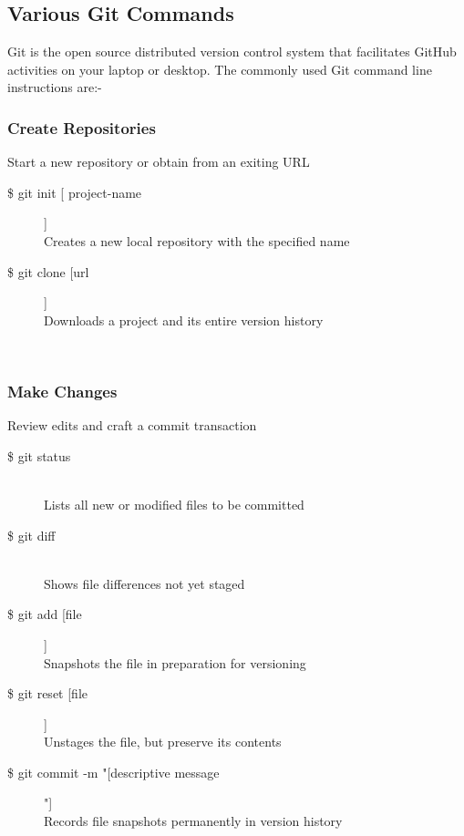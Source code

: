 \subsection{Various Git Commands}

Git is the open source distributed version control system that facilitates GitHub activities on your laptop or desktop. The commonly used Git command line instructions are:-\\



\subsubsection{Create Repositories}
Start a new repository or obtain from an exiting URL

\begin{description}

\item [\$ git init [ project-name]]\\
Creates a new local repository with the specified name
\item [\$ git clone [url]]\\
Downloads a project and its entire version history

\end{description}
\leavevmode \\


\subsubsection{Make Changes}
Review edits and craft a commit transaction

\begin{description}

\item [\$ git status] \leavevmode \\
Lists all new or modified files to be committed

\item [\$ git diff] \leavevmode \\
Shows file differences not yet staged

\item [\$ git add [file]]\\
Snapshots the file in preparation for versioning

\item [\$ git reset [file]]\\
Unstages the file, but preserve its contents

\item [\$ git commit -m "[descriptive message]"]\\
Records file snapshots permanently in version history

\end{description}
\leavevmode \\


